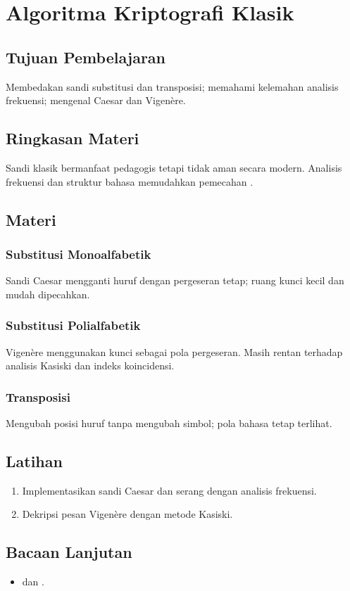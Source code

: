 \documentclass[../main.tex]{subfiles}
\begin{document}
\chapter{Algoritma Kriptografi Klasik}
\section{Tujuan Pembelajaran}
Membedakan sandi substitusi dan transposisi; memahami kelemahan analisis frekuensi; mengenal Caesar dan Vigen\`{e}re.

\section{Ringkasan Materi}
Sandi klasik bermanfaat pedagogis tetapi tidak aman secara modern. Analisis frekuensi dan struktur bahasa memudahkan pemecahan \citep{wikipedia_caesar,wikipedia_vigenere}.

\section{Materi}
\subsection{Substitusi Monoalfabetik}
Sandi Caesar mengganti huruf dengan pergeseran tetap; ruang kunci kecil dan mudah dipecahkan.

\subsection{Substitusi Polialfabetik}
Vigen\`{e}re menggunakan kunci sebagai pola pergeseran. Masih rentan terhadap analisis Kasiski dan indeks koincidensi.

\subsection{Transposisi}
Mengubah posisi huruf tanpa mengubah simbol; pola bahasa tetap terlihat.

\section{Latihan}
\begin{enumerate}
  \item Implementasikan sandi Caesar dan serang dengan analisis frekuensi.
  \item Dekripsi pesan Vigen\`{e}re dengan metode Kasiski.
\end{enumerate}

\section{Bacaan Lanjutan}
\begin{itemize}
  \item \citep{wikipedia_caesar} dan \citep{wikipedia_vigenere}.
\end{itemize}
\end{document}
